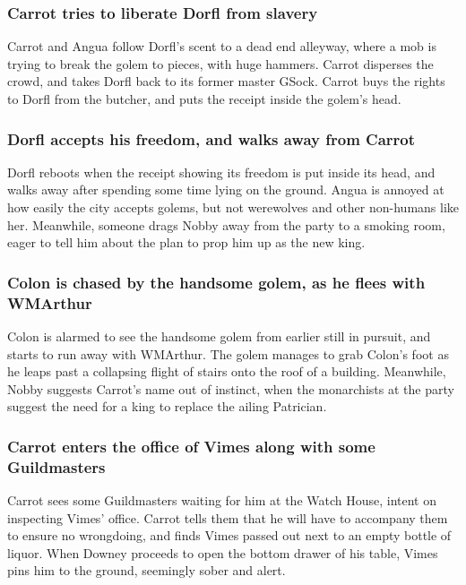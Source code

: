 \subsubsection{\Gls{Carrot} tries to liberate \Gls{Dorfl} from slavery}
\Gls{Carrot} and \Gls{Angua} follow \Gls{Dorfl}'s scent to a dead end alleyway, where a mob is
trying to break the golem to pieces, with huge hammers. \Gls{Carrot} disperses the crowd, and takes
\Gls{Dorfl} back to its former master \Gls{GSock}. \Gls{Carrot} buys the rights to \Gls{Dorfl}
from the butcher, and puts the receipt inside the golem's head.

\subsubsection{\Gls{Dorfl} accepts his freedom, and walks away from \Gls{Carrot}}
\Gls{Dorfl} reboots when the receipt showing its freedom is put inside its head, and walks away
after spending some time lying on the ground. \Gls{Angua} is annoyed at how easily the city
accepts golems, but not werewolves and other non-humans like her. Meanwhile, someone drags
\Gls{Nobby} away from the party to a smoking room, eager to tell him about the plan to prop him up
as the new king.

\subsubsection{\Gls{Colon} is chased by the handsome golem, as he flees with \Gls{WMArthur}}
\Gls{Colon} is alarmed to see the handsome golem from earlier still in pursuit, and starts to run
away with \Gls{WMArthur}. The golem manages to grab \Gls{Colon}'s foot as he leaps past a collapsing
flight of stairs onto the roof of a building. Meanwhile, \Gls{Nobby} suggests \Gls{Carrot}'s name
out of instinct, when the monarchists at the party suggest the need for a king to replace the
ailing Patrician.

\subsubsection{\Gls{Carrot} enters the office of \Gls{Vimes} along with some Guildmasters}
\Gls{Carrot} sees some Guildmasters waiting for him at the Watch House, intent on inspecting
\Gls{Vimes}' office. \Gls{Carrot} tells them that he will have to accompany them to ensure no
wrongdoing, and finds \Gls{Vimes} passed out next to an empty bottle of liquor. When \Gls{Downey}
proceeds to open the bottom drawer of his table, \Gls{Vimes} pins him to the ground, seemingly sober
and alert.

